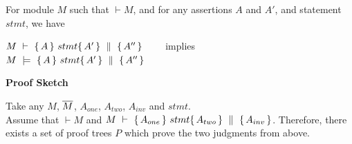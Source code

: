 \begin{theorem}
\label{t:quadruple:sound}
For module  $M$ %
such that  $\vdash M$, and for any assertions $A$ and $A'$, and statement  $stmt$, we have

\begin{center}
$M\ \vdash\   \{\, A \, \}\ stmt \{\, A' \, \} \, \,\parallel\,\, \{\, A'' \, \} $ \ \ \ \ implies \ \ \ \ $M\ \models\  \quadruple {A} {stmt} {A'} {A''}$
\end{center}

\end{theorem}

\noindent
\vspace{.2cm}
  {\textbf{Proof Sketch}} 

Take any $M$, $\overline{M}$, $A_{one}$, $A_{two}$, $A_{inv}$ and $stmt$.\\ Assume that $\vdash M$  and 
$M\ \vdash\   \{\, A_{one} \, \}\ stmt \{\, A_{two} \, \} \, \,\parallel\,\, \{\, A_{inv} \, \} $.
Therefore, there exists a set of
proof trees $P$ which prove  the two judgments from above.
 
